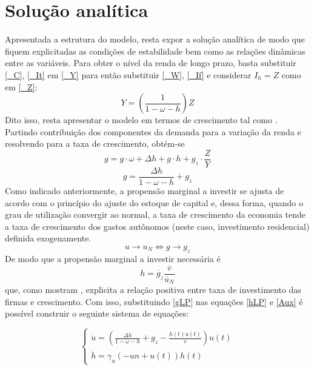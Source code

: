 \section{Solução analítica}
\label{SecAnalitica}

Apresentada a estrutura do modelo, resta expor a solução analítica de modo que fiquem explicitadas as condições de estabilidade bem como as relações dinâmicas entre as variáveis. Para obter o nível da renda de longo prazo, basta substituir \ref{_C}, \ref{_It} em \ref{_Y} para então substituir \ref{_W}, \ref{_If} e considerar $I_h = Z$ como em \ref{_Z}:
\begin{equation}
    \label{AnaliticaNivel}
    Y = \left(\frac{1}{1-\omega - h}\right)Z
\end{equation}
Dito isso, resta apresentar o modelo em termos de crescimento tal como \textcite{freitas_growth_2015}. Partindo contribuição dos componentes da demanda para a variação da renda e resolvendo para a taxa de crescimento, obtém-se
$$
g = g\cdot \omega + \Delta h + g\cdot h + g_z\cdot \frac{Z}{Y}
$$
\begin{equation}
\label{gLP}
    g = \frac{\Delta h}{1 - \omega - h} + g_z
\end{equation}
Como indicado anteriormente, a propensão marginal a investir se ajusta de acordo com o princípio do ajuste do estoque de capital e, dessa forma, quando o grau de utilização convergir ao normal, a taxa de crescimento da economia tende a taxa de crescimento dos gastos autônomos (neste caso, investimento residencial) definida exogenamente. 
\begin{equation}
u \to u_N \Leftrightarrow g \to g_z
\end{equation}
De modo que a propensão marginal a investir necessária é
\begin{equation}
\label{hLP}
h = \overline g_z\frac{\overline v}{\overline u_N}
\end{equation}
que, como mostram \textcite{fagundes_role_2017}, explicita a relação positiva entre taxa de investimento das firmas e crescimento. Com isso, substituindo \ref{gLP} nas equações \ref{hLP} e \ref{Aux} é possível construir o seguinte sistema de equações:

$$
\begin{cases}
\dot u = \left(\frac{\Delta h}{1 - \omega - h} + g_z - \frac{h{\left(t \right)} u{\left(t \right)}}{v}\right) u{\left(t \right)}\\
\dot h = \gamma_{u} \left(- un + u{\left(t \right)}\right) h{\left(t \right)}
\end{cases}
$$

